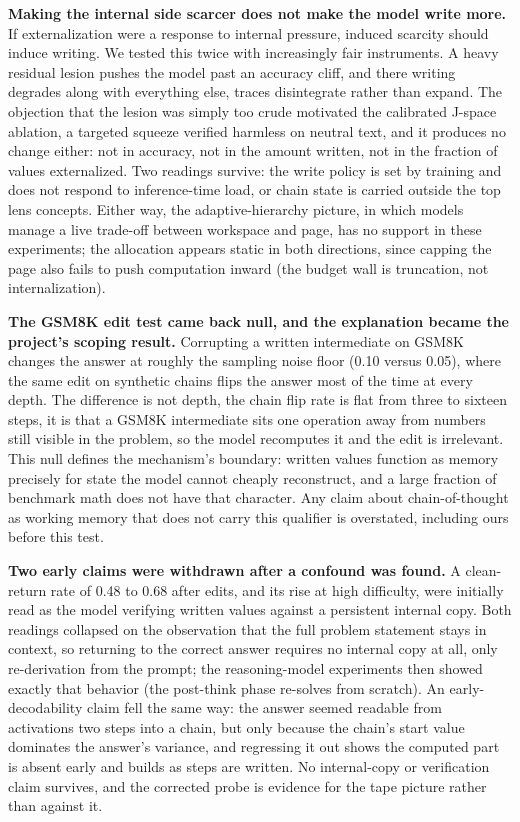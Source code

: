 \textbf{Making the internal side scarcer does not make the model write
more.} If externalization were a response to internal pressure, induced
scarcity should induce writing. We tested this twice with increasingly
fair instruments. A heavy residual lesion pushes the model past an
accuracy cliff, and there writing degrades along with everything else,
traces disintegrate rather than expand. The objection that the lesion
was simply too crude motivated the calibrated J-space ablation, a
targeted squeeze verified harmless on neutral text, and it produces no
change either: not in accuracy, not in the amount written, not in the
fraction of values externalized. Two readings survive: the write policy
is set by training and does not respond to inference-time load, or chain
state is carried outside the top lens concepts. Either way, the
adaptive-hierarchy picture, in which models manage a live trade-off
between workspace and page, has no support in these experiments; the
allocation appears static in both directions, since capping the page
also fails to push computation inward (the budget wall is truncation,
not internalization).

\textbf{The GSM8K edit test came back null, and the explanation became
the project's scoping result.} Corrupting a written intermediate on
GSM8K changes the answer at roughly the sampling noise floor (0.10
versus 0.05), where the same edit on synthetic chains flips the answer
most of the time at every depth. The difference is not depth, the chain
flip rate is flat from three to sixteen steps, it is that a GSM8K
intermediate sits one operation away from numbers still visible in the
problem, so the model recomputes it and the edit is irrelevant. This
null defines the mechanism's boundary: written values function as memory
precisely for state the model cannot cheaply reconstruct, and a large
fraction of benchmark math does not have that character. Any claim about
chain-of-thought as working memory that does not carry this qualifier is
overstated, including ours before this test.

\textbf{Two early claims were withdrawn after a confound was found.} A
clean-return rate of 0.48 to 0.68 after edits, and its rise at high
difficulty, were initially read as the model verifying written values
against a persistent internal copy. Both readings collapsed on the
observation that the full problem statement stays in context, so
returning to the correct answer requires no internal copy at all, only
re-derivation from the prompt; the reasoning-model experiments then
showed exactly that behavior (the post-think phase re-solves from
scratch). An early-decodability claim fell the same way: the answer
seemed readable from activations two steps into a chain, but only
because the chain's start value dominates the answer's variance, and
regressing it out shows the computed part is absent early and builds as
steps are written. No internal-copy or verification claim survives, and
the corrected probe is evidence for the tape picture rather than against
it.

